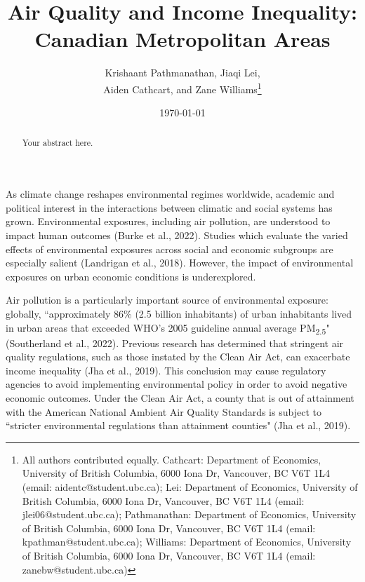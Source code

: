 \documentclass[AEJ]{AEA}
\begin{document}
\title{Air Quality and Income Inequality:\\Canadian Metropolitan Areas}
\author{Krishaant Pathmanathan, Jiaqi Lei,\\Aiden Cathcart, and Zane Williams\thanks{%
All authors contributed equally.
Cathcart: Department of Economics, University of British Columbia, 6000 Iona Dr,
Vancouver, BC V6T 1L4 (email: aidentc@student.ubc.ca);
Lei: Department of Economics, University of British Columbia, 6000 Iona Dr,
Vancouver, BC V6T 1L4 (email: jlei06@student.ubc.ca);
Pathmanathan: Department of Economics, University of British Columbia, 6000 Iona Dr,
Vancouver, BC V6T 1L4 (email: kpathman@student.ubc.ca);
Williams: Department of Economics, University of British Columbia, 6000 Iona Dr,
Vancouver, BC V6T 1L4 (email: zanebw@student.ubc.ca)}}
\date{\today}
\JEL{}
\Keywords{}

\begin{abstract}
Your abstract here.
\end{abstract}

\maketitle

As climate change reshapes environmental regimes worldwide, academic and
political interest in the interactions between climatic and social systems has 
grown. Environmental exposures, including air pollution, are understood to 
impact human outcomes (Burke et al., 2022). Studies which evaluate the varied effects of
environmental exposures across social and economic subgroups are especially
salient (Landrigan et al., 2018). However, the impact of environmental exposures 
on urban economic
conditions is underexplored.

Air pollution is a particularly important source of environmental exposure:
globally, ``approximately 86\% (2.5 billion inhabitants) of urban inhabitants 
lived in urban areas that exceeded WHO's 2005 guideline annual average 
PM\textsubscript{2.5}" (Southerland et al., 2022). Previous research has 
determined that stringent 
air quality regulations, such as those instated by the Clean Air Act, can 
exacerbate income inequality (Jha et al., 2019). This conclusion may cause regulatory 
agencies to avoid implementing environmental policy in order to avoid negative 
economic outcomes. Under the Clean Air Act, a county that is out of attainment 
with the American National Ambient Air Quality Standards is subject to ``stricter
environmental regulations than attainment counties" (Jha et al., 2019).
\end{document}
